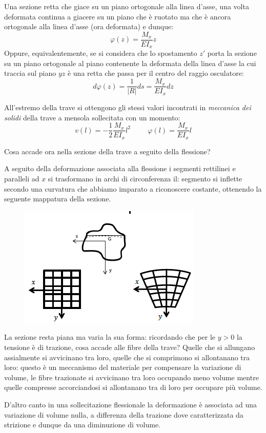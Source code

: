 		Una sezione retta che giace su un piano ortogonale alla linea d’asse, una volta deformata
		continua a giacere su un piano che è ruotato ma che è ancora ortogonale alla linea d’asse (ora
		deformata) e dunque: 
		\[ \varphi(z) = \dfrac{M_x}{EI_x}z \]
		Oppure, equivalentemente, se si considera che lo spostamento $z'$ porta la sezione su un piano ortogonale al piano contenente la deformata della linea d’asse
		la cui traccia sul piano $ yz $ è una retta che passa per il centro del raggio osculatore:
		\[ d\varphi(z) = \dfrac{1}{|R|}ds = \dfrac{M_x}{EI_x}dz \]
		
		All'estremo della trave si ottengono gli stessi valori incontrati in \textit{meccanica dei solidi} della trave a mensola sollecitata con un momento:
		\[ v(l) = -\dfrac{1}{2}\dfrac{M_x}{EI_x}l^2 \hspace{1cm} \varphi(l) = \dfrac{M_x}{EI_x}l\]
		
		Cosa accade ora nella sezione della trave a seguito della flessione? 
		
		A seguito della deformazione associata alla flessione i segmenti rettilinei e paralleli ad $x$ si trasformano in archi di circonferenza il: segmento si inflette secondo una curvatura che abbiamo imparato a riconoscere costante, ottenendo la seguente mappatura della sezione.
		
\begin{figure}[H]
	\centering
	\includegraphics[width=0.5\linewidth]{Immagini_3/screenshot005}
	\label{fig:screenshot005}
\end{figure}

		La sezione resta piana ma varia la sua forma: ricordando che per le $y>0$ la tensione è di trazione, cosa accade alle fibre della trave? Quelle che si allungano assialmente si avvicinano tra loro, quelle che si comprimono si allontanano tra loro: questo è un meccanismo del materiale per compensare la variazione di volume, le fibre trazionate si avvicinano tra loro occupando meno volume mentre quelle compresse accorciandosi si allontanano tra di loro per occupare più volume.
		
		D'altro canto in una sollecitazione flessionale la deformazione è associata ad una variazione di volume nulla, a differenza della trazione dove caratterizzata da strizione e dunque da una diminuzione di volume.  
		

